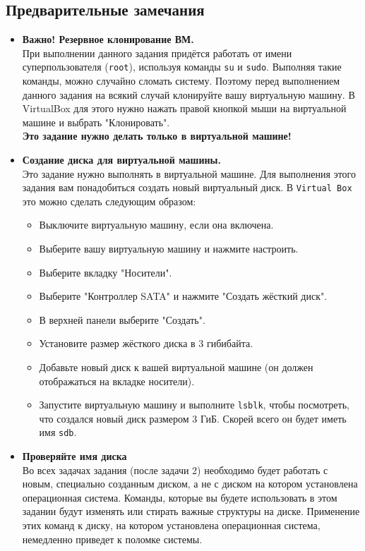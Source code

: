 \documentclass{article}
\begin{document}
\subsection*{Предварительные замечания}
\begin{itemize}
\item \textbf{Важно! Резервное клонирование ВМ.} \\
При выполнении данного задания придётся работать от имени суперпользователя (\texttt{root}), используя команды \texttt{su} и \texttt{sudo}. Выполняя такие команды, можно случайно сломать систему. Поэтому перед выполнением данного задания на всякий случай клонируйте вашу виртуальную машину. В VirtualBox для этого нужно нажать правой кнопкой мыши на виртуальной машине и выбрать "Клонировать".\\
\textbf{Это задание нужно делать только в виртуальной машине!}



\item \textbf{Создание диска для виртуальной машины.} \\
Это задание нужно выполнять в виртуальной машине. Для выполнения этого задания вам понадобиться создать новый виртуальный диск. В \texttt{Virtual Box} это можно сделать следующим образом:
\begin{itemize}
\item Выключите виртуальную машину, если она включена.
\item Выберите вашу виртуальную машину и нажмите настроить.
\item Выберите вкладку "Носители".
\item Выберите "Контроллер SATA"{} и нажмите "Создать жёсткий диск".
\item В верхней панели выберите "Создать".
\item Установите размер жёсткого диска в 3 гибибайта. 
\item Добавьте новый диск к вашей виртуальной машине (он должен отображаться на вкладке носители). 
\item Запустите виртуальную машину и выполните \texttt{lsblk}, чтобы посмотреть, что создался новый диск размером 3 ГиБ. Скорей всего он будет иметь имя \texttt{sdb}.
\end{itemize}


\item \textbf{Проверяйте имя диска} \\
Во всех задачах задания (после задачи 2) необходимо будет работать с новым, специально созданным диском, а не с диском на котором установлена операционная система. Команды, которые вы будете использовать в этом задании будут изменять или стирать важные структуры на диске. Применение этих команд к диску, на котором установлена операционная система, немедленно приведет к поломке системы.


\end{itemize}
\end{document}

